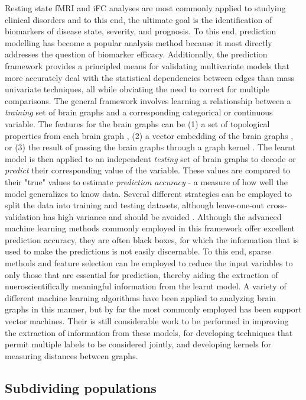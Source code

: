 Resting state fMRI and iFC analyses are most commonly applied to studying clinical disorders and to this end, the ultimate goal is the identification of biomarkers of disease state, severity, and prognosis\cite{DiMartino}. To this end, prediction modelling has become a popular analysis method because it most directly addresses the question of biomarker efficacy\cite{craddock,Dosenbach,review}. Additionally, the prediction framework provides a principled means for validating multivariate models that more accurately deal with the statistical dependencies between edges than mass univariate techniques, all while obviating the need to correct for multiple comparisons. The general framework involves learning a relationship between a \emph{training} set of brain graphs and a corresponding categorical or continuous variable. The features for the brain graphs can be (1) a set of topological properties from each brain graph \cite{Cecci2009, Bassett2012}, (2) a vector embedding of the brain graphs \cite{Richiadi2013,Luo2003}, or (3) the result of passing the brain graphs through a graph kernel \cite{}. The learnt model is then applied to an independent \emph{testing} set of brain graphs to decode or \emph{predict} their corresponding value of the variable. These values are compared to their "true" values to estimate \emph{prediction accuracy} - a measure of how well the model generalizes to know data. Several different strategies can be employed to split the data into training and testing datasets, although leave-one-out cross-validation has high variance and should be avoided \cite{}. Although the advanced machine learning methods commonly employed in this framework offer excellent prediction accuracy, they are often black boxes, for which the information that is used to make the predictions is not easily discernable. To this end, sparse methods and feature selection can be employed to reduce the input variables to only those that are essential for prediction, thereby aiding the extraction of nueroscientifically meaningful information from the learnt model. A variety of different machine learning algorithms have been applied to analyzing brain graphs in this manner, but by far the most commonly employed has been support vector machines\cite{DiMartino}. Their is still considerable work to be performed in improving the extraction of information from these models, for developing techniques that permit multiple labels to be considered jointly, and developing kernels for measuring distances between graphs.

\subsection{Subdividing populations}

